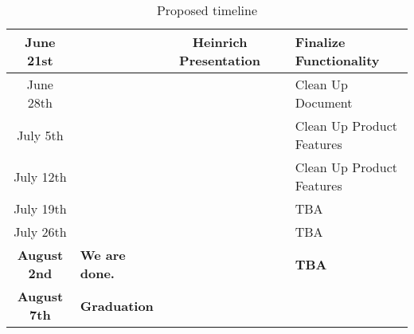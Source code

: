 \begin{table}[h!]
{\begin{tabular}{|S|L|S|L|L|}
  June 21st                     &                       & Heinrich Presentation            &                                        & Finalize Functionality                               \\ \hline
  June 28th                     &                       &                                  &                                        & Clean Up Document                                    \\ \hline
  July 5th                      &                       &                                  &                                        & Clean Up Product Features                            \\ \hline
  July 12th                     &                       &                                  &                                        & Clean Up Product Features                            \\ \hline
  July 19th                     &                       &                                  &                                        & TBA                                                  \\ \hline
  July 26th                     &                       &                                  &                                        & TBA                                                  \\ \hline
  \textbf{August 2nd}           & \textbf{We are done.} & \textbf{}                        & \textbf{}                              & \textbf{TBA}                                         \\ \hline
  \textbf{August 7th}           & \textbf{Graduation}   & \textbf{}                        & \textbf{}                              & \textbf{}                                            \\ \hline
  \end{tabular}}
  \caption{Proposed timeline}
  \label{Tab:milestones}
\end{table}
\clearpage
